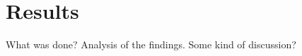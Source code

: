 
\chapter{Results}

What was done? Analysis of the findings. Some kind of discussion?

\cleardoublepage